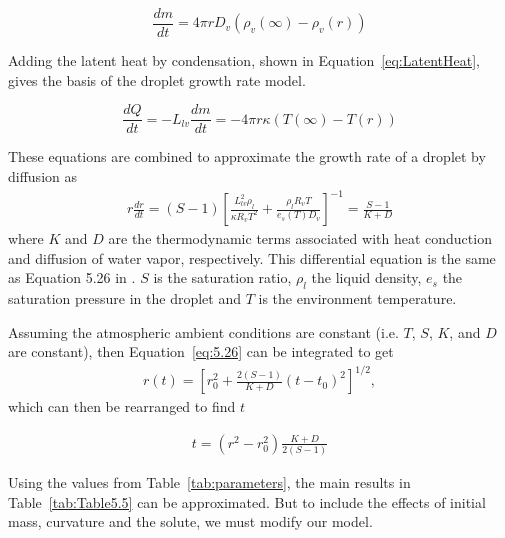 \documentclass[]{article}
\begin{document}
\begin{equation}
    \label{eq:Diffusion}
    \dfrac{dm}{dt}=4 \pi r D_{v} \left( \rho_{v}(\infty) - \rho_{v}(r) \right)
\end{equation}

Adding the latent heat by condensation, shown in
Equation~\eqref{eq:LatentHeat}, gives the basis of the droplet growth rate
model.

\begin{equation}
    \label{eq:LatentHeat}
    \dfrac{dQ}{dt}=-L_{lv}\dfrac{dm}{dt}=-4 \pi r \kappa \left( T(\infty) - T(r) \right)
\end{equation}

These equations are combined to approximate the growth rate of a droplet by
diffusion as
\begin{align}
    \label{eq:5.26}
    r \frac{dr}{dt} = (S - 1) \left[ \frac{L_{lv}^2 \rho_l}{\kappa R_v T^2} + \frac{\rho_l R_v T}{e_s(T) D_v} \right] ^{-1} = \frac{S - 1}{K + D}
\end{align}
where $K$ and $D$ are the thermodynamic terms associated with heat conduction
and diffusion of water vapor, respectively. This differential equation is the
same as Equation 5.26 in \cite{Mason}. $S$ is the saturation ratio, $\rho_l$
the liquid density, $e_s$ the saturation pressure in the droplet and $T$ is the
environment temperature.

Assuming the atmospheric ambient conditions are constant (i.e. $T$, $S$, $K$,
and $D$ are constant), then Equation~\eqref{eq:5.26} can be integrated to get
\begin{align}
    \label{eq:5.27}
    r(t) = \left[ r_0^2 + \frac{2(S -1)}{K + D}(t - t_0)^2 \right] ^{1/2},
\end{align}
which can then be rearranged to find $t$

\begin{align}
    \label{eq:5.27T}
    t = (r^2 - r_0^2) \frac{K + D}{2(S - 1)}
\end{align}

Using the values from Table~\ref{tab:parameters}, the main results in
Table~\ref{tab:Table5.5} can be approximated. But to include the effects of
initial mass, curvature and the solute, we must modify our model.
\end{document}
